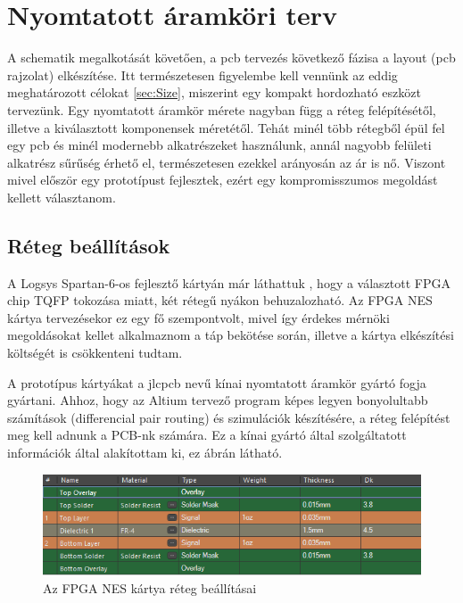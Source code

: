 \section{Nyomtatott áramköri terv}

A schematik megalkotását követően, a pcb tervezés következő fázisa a layout (pcb rajzolat) elkészítése. Itt természetesen figyelembe kell vennünk az eddig meghatározott célokat \ref{sec:Size}, miszerint egy kompakt hordozható eszközt tervezünk. Egy nyomtatott áramkör mérete nagyban függ a réteg felépítésétől, illetve a kiválasztott komponensek méretétől. Tehát minél több rétegből épül fel egy pcb és minél modernebb alkatrészeket használunk, annál nagyobb felületi alkatrész sűrűség érhető el, természetesen ezekkel arányosán az ár is nő. Viszont mivel először egy prototípust fejlesztek, ezért egy kompromisszumos megoldást kellett választanom.   
		
	\subsection{Réteg beállítások}
	
	A Logsys Spartan-6-os fejlesztő kártyán már láthattuk \cite{spatan6}, hogy a választott FPGA chip TQFP tokozása miatt, két rétegű nyákon behuzalozható. Az FPGA NES kártya tervezésekor ez egy fő szempontvolt, mivel így érdekes mérnöki megoldásokat kellet alkalmaznom a táp bekötése során, illetve a kártya elkészítési költségét is csökkenteni tudtam.
	
	A prototípus kártyákat a jlcpcb nevű kínai nyomtatott áramkör gyártó fogja gyártani. Ahhoz, hogy az Altium tervező program képes legyen bonyolultabb számítások (differencial pair routing) és szimulációk készítésére, a réteg felépítést meg kell adnunk a PCB-nk számára. Ez a kínai gyártó által szolgáltatott információk által \cite{jlcpcb} alakítottam ki, ez  ábrán látható.    
	
	\begin{figure}[H]
		\centering
		\includegraphics[width=150mm, keepaspectratio]{figures/Layer-stackup}
		\caption{Az FPGA NES kártya réteg beállításai}
		\label{fig:Layer-stackup}
	\end{figure}
	
